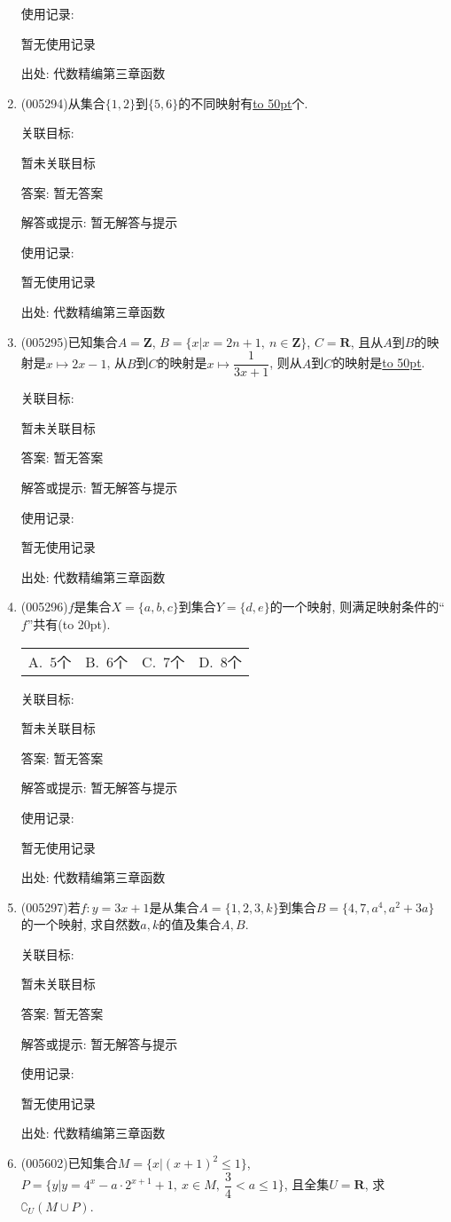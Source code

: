 \documentclass[10pt,a4paper]{article}
\newcommand{\blank}[1]{\underline{\hbox to #1pt{}}}
\newcommand{\bracket}[1]{(\hbox to #1pt{})}
\newcommand{\fourch}[4]{\par\begin{tabular}{p{.23\textwidth}p{.23\textwidth}p{.23\textwidth}p{.23\textwidth}}
A.~#1 &B.~#2& C.~#3& D.~#4
\end{tabular}}
\begin{document}
\begin{enumerate}[1.]
使用记录:

暂无使用记录


出处: 代数精编第三章函数
\item { (005294)}从集合$\{1,2\}$到$\{5,6\}$的不同映射有\blank{50}个.


关联目标:

暂未关联目标

答案: 暂无答案

解答或提示: 暂无解答与提示

使用记录:

暂无使用记录


出处: 代数精编第三章函数
\item { (005295)}已知集合$A=\mathbf{Z}$, $B=\{x|x=2n+1, \ n\in \mathbf{Z}\}$, $C=\mathbf{R}$, 且从$A$到$B$的映射是$x\mapsto 2x-1$, 从$B$到$C$的映射是$x\mapsto \dfrac 1{3x+1}$, 则从$A$到$C$的映射是\blank{50}.


关联目标:

暂未关联目标

答案: 暂无答案

解答或提示: 暂无解答与提示

使用记录:

暂无使用记录


出处: 代数精编第三章函数
\item { (005296)}$f$是集合$X=\{a,b,c\}$到集合$Y=\{d,e\}$的一个映射, 则满足映射条件的``$f$''共有\bracket{20}.
\fourch{$5$个}{$6$个}{$7$个}{$8$个}


关联目标:

暂未关联目标

答案: 暂无答案

解答或提示: 暂无解答与提示

使用记录:

暂无使用记录


出处: 代数精编第三章函数
\item { (005297)}若$f:y=3x+1$是从集合$A=\{1,2,3,k\}$到集合$B=\{4,7,a^4,a^2+3a\}$的一个映射, 求自然数$a,k$的值及集合$A,B$.


关联目标:

暂未关联目标

答案: 暂无答案

解答或提示: 暂无解答与提示

使用记录:

暂无使用记录


出处: 代数精编第三章函数
\item { (005602)}已知集合$M=\{x|(x+1)^2\le 1\}$, $P=\{y|y=4^x-a\cdot 2^{x+1}+1,\ x\in M,\ \dfrac 34<a\le 1\}$, 且全集$U=\mathbf{R}$, 求$\complement _U(M\cup P)$.



\end{enumerate}
\end{document}
